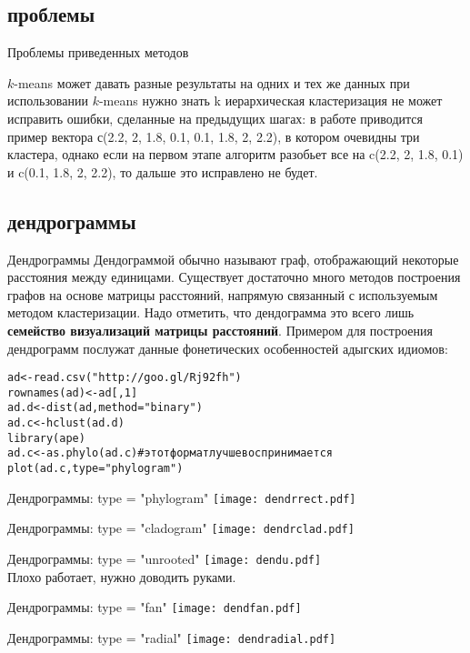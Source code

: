 \subsection{проблемы}
\begin{frame}{Проблемы приведенных методов}
\begin{itemize}
\mytem $k$-means может давать разные результаты на одних и тех же данных
\mytem при использовании $k$-means нужно знать k
\mytem иерархическая кластеризация не может исправить ошибки, сделанные на предыдущих шагах: в работе \citep{hawkins82} приводится пример вектора  с(2.2, 2, 1.8, \alert{0.1, 0.1,} 1.8, 2, 2.2), в котором очевидны три кластера, однако если на первом этапе алгоритм разобьет все на c(2.2, 2, 1.8, 0.1) и c(0.1, 1.8, 2, 2.2), то дальше это исправлено не будет.
\end{itemize}
\end{frame}
\subsection{дендрограммы}
\begin{frame}{Дендрограммы}
Дендограммой обычно называют граф, отображающий некоторые расстояния между единицами. Существует достаточно много методов построения графов на основе матрицы расстояний, напрямую связанный с используемым методом кластеризации. Надо отметить, что дендограмма это всего лишь \textbf{семейство визуализаций матрицы расстояний}. Примером для построения дендрограмм послужат данные фонетических особенностей адыгских идиомов:\\
\scriptsize
\begin{alltt}
ad <- read.csv("http://goo.gl/Rj92fh")\\
rownames(ad) <- ad[,1]\\
ad.d <- dist(ad, method = "binary")\\
ad.c <- hclust(ad.d)\\
\alert{library(ape)}\\
ad.c <- \alert{as.phylo(}ad.c\alert{)} \hfill \# этот формат лучше воспринимается\\
\alert{plot(ad.c, type = "phylogram")}
\end{alltt}
\normalsize
\end{frame}
\begin{frame}{Дендрограммы: type = "phylogram"}
\texttt{[image: dendrrect.pdf]}
\end{frame}
\begin{frame}{Дендрограммы: type = "cladogram"}
\texttt{[image: dendrclad.pdf]}
\end{frame}
\begin{frame}{Дендрограммы: type = "unrooted"}
\texttt{[image: dendu.pdf]}\\
Плохо работает, нужно доводить руками.
\end{frame}
\begin{frame}{Дендрограммы: type = "fan"}
\texttt{[image: dendfan.pdf]}
\end{frame}
\begin{frame}{Дендрограммы: type = "radial"}
\texttt{[image: dendradial.pdf]}
\end{frame}

